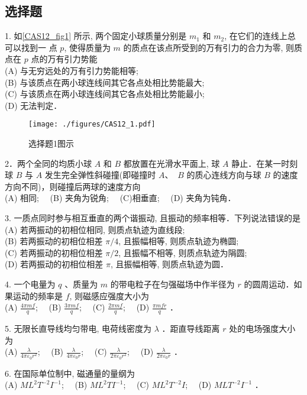 \subsection{选择题}
1. 如\autoref{CAS12_fig1} 所示, 两个固定小球质量分别是 $m_{1}$ 和 $m_{2}$, 在它们的连线上总可以找到一
点 $p$, 使得质量为 $m$ 的质点在该点所受到的万有引力的合力为零, 则质点在 $p$
点的万有引力势能\\
(A) 与无穷远处的万有引力势能相等;\\
(B) 与该质点在两小球连线间其它各点处相比势能最大;\\
(C) 与该质点在两小球连线间其它各点处相比势能最小;\\
(D) 无法判定．
\begin{figure}[ht]
\centering
\texttt{[image: ./figures/CAS12\_1.pdf]}
\caption{选择题1图示} \label{CAS12_fig1}
\end{figure}
2．两个全同的均质小球 ${A}$ 和 ${B}$ 都放置在光滑水平面上, 球 ${A}$ 静止．在某一时刻球 ${B}$ 与 ${A}$ 发生完全弹性斜碰撞(即碰撞时 ${A}$、 ${~B}$ 的质心连线方向与球 ${B}$ 的速度方向不同)，则碰撞后两球的速度方向\\
(A) 相同;$\quad$
(B) 夹角为锐角;$\quad$
(C)相垂直;$\quad$
(D) 夹角为钝角．

3. 一质点同时参与相互垂直的两个谐振动, 且振动的频率相等．下列说法错误的是\\
(A) 若两振动的初相位相同, 则质点轨迹为直线段;\\
(B) 若两振动的初相位相差 $\pi / 4$, 且振幅相等, 则质点轨迹为椭圆;\\
(C) 若两振动的初相位相差 $\pi / 2$, 且振幅不相等, 则质点轨迹为䧎圆;\\
(D) 若两振动的初相位相差 $\pi$, 且振幅相等, 则质点轨迹为圆．

4. 一个电量为 $q$ 、质量为 $m$ 的带电粒子在匀强磁场中作半径为 $r$ 的圆周运动．如果运动的频率是 $f$, 则磁感应强度大小为\\
(A) $\frac{4 \pi m f}{q}$;$\quad$
(B) $\frac{3 \pi m f}{q}$;$\quad$
(C) $\frac{2 \pi m f}{q}$;$\quad$
(D) $\frac{\pi m f r}{q}$ ．

5. 无限长直导线均匀带电, 电荷线密度为 $\lambda$ ．距直导线距离 $r$ 处的电场强度大小为\\
(A) $\frac{\lambda}{4 \pi \varepsilon_{0} r^{2}}$;$\quad$
(B) $\frac{\lambda}{4 \pi \varepsilon_{0} r}$;$\quad$
(C) $\frac{\lambda}{2 \pi \varepsilon_{0} r^{2}}$;$\quad$
(D) $\frac{\lambda}{2 \pi \varepsilon_{0} r}$ ．

6. 在国际单位制中, 磁通量的量纲为\\
(A) $M L^{2} T^{-2} I^{-1}$;$\quad$
(B) $M L^{2} T I^{-1}$;$\quad$
(C) $M L^{2} T^{-2} I$;$\quad$
(D) $M L T^{-2} I^{-1}$ ．

